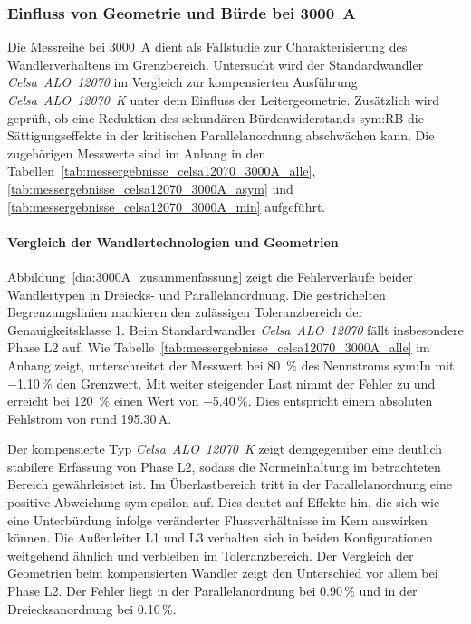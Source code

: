 \subsubsection{Einfluss von Geometrie und Bürde bei \SI{3000}{A}}
\label{sec:analyse_messreihe_3000A}

Die Messreihe bei \SI{3000}{A} dient als Fallstudie zur Charakterisierung des Wandlerverhaltens im Grenzbereich. Untersucht wird der Standardwandler \textit{Celsa~ALO~12070} im Vergleich zur kompensierten Ausführung \textit{Celsa~ALO~12070~K} unter dem Einfluss der Leitergeometrie. Zusätzlich wird geprüft, ob eine Reduktion des sekundären Bürdenwiderstands \gls{sym:RB} die Sättigungseffekte in der kritischen Parallelanordnung abschwächen kann. Die zugehörigen Messwerte sind im Anhang in den Tabellen~\ref{tab:messergebnisse_celsa12070_3000A_alle}, \ref{tab:messergebnisse_celsa12070_3000A_asym} und \ref{tab:messergebnisse_celsa12070_3000A_min} aufgeführt.

\paragraph{Vergleich der Wandlertechnologien und Geometrien}

Abbildung~\ref{dia:3000A_zusammenfassung} zeigt die Fehlerverläufe beider Wandlertypen in Dreiecks- und Parallelanordnung. Die gestrichelten Begrenzungslinien markieren den zulässigen Toleranzbereich der Genauigkeitsklasse \num{1}. Beim Standardwandler \textit{Celsa~ALO~12070} fällt insbesondere Phase L2 auf. Wie Tabelle~\ref{tab:messergebnisse_celsa12070_3000A_alle} im Anhang zeigt, unterschreitet der Messwert bei \SI{80}{\percent} des Nennstroms \gls{sym:In} mit \num{-1,10}\,\% den Grenzwert. Mit weiter steigender Last nimmt der Fehler zu und erreicht bei \SI{120}{\percent} einen Wert von \num{-5,40}\,\%. Dies entspricht einem absoluten Fehlstrom von rund \num{195,30}\,\unit{A}.

Der kompensierte Typ \textit{Celsa~ALO~12070~K} zeigt demgegenüber eine deutlich stabilere Erfassung von Phase L2, sodass die Normeinhaltung im betrachteten Bereich gewährleistet ist. Im Überlastbereich tritt in der Parallelanordnung eine positive Abweichung \gls{sym:epsilon} auf. Dies deutet auf Effekte hin, die sich wie eine Unterbürdung infolge veränderter Flussverhältnisse im Kern auswirken können. Die Außenleiter L1 und L3 verhalten sich in beiden Konfigurationen weitgehend ähnlich und verbleiben im Toleranzbereich. Der Vergleich der Geometrien beim kompensierten Wandler zeigt den Unterschied vor allem bei Phase L2. Der Fehler liegt in der Parallelanordnung bei \num{0,90}\,\% und in der Dreiecksanordnung bei \num{0,10}\,\%.

